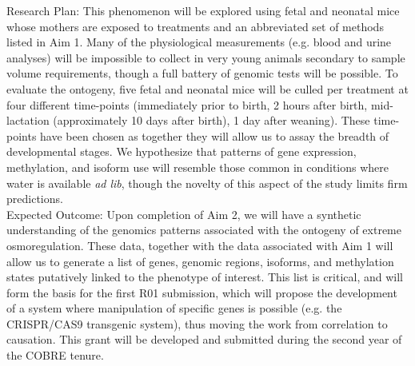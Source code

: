 \documentclass[12pt]{article}
\begin{document}
Research Plan: This phenomenon will be explored using fetal and neonatal mice whose mothers are exposed to treatments and an abbreviated set of methods listed in Aim 1. Many of the physiological measurements  (e.g. blood and urine analyses) will be impossible to collect in very young animals secondary to sample volume requirements, though a full battery of genomic tests will be possible. To evaluate the ontogeny, five fetal and neonatal mice will be culled per treatment at four different time-points (immediately prior to birth, 2 hours after birth, mid-lactation (approximately 10 days after birth), 1 day after weaning). These time-points have been chosen as together they will allow us to assay the breadth of developmental stages.  We hypothesize that patterns of gene expression, methylation, and isoform use will resemble those common in conditions where water is available \textit{ad lib}, though the novelty of this aspect of the study limits firm predictions. \\

Expected Outcome: Upon completion of Aim 2, we will have a synthetic understanding of the genomics patterns associated with the ontogeny of extreme osmoregulation. These data, together with the data associated with Aim 1 will allow us to generate a list of genes, genomic regions, isoforms, and methylation states putatively linked to the phenotype of interest. This list is critical, and will form the basis for the first R01 submission, which will propose the development of a system where manipulation of specific genes is possible (e.g. the CRISPR/CAS9 transgenic system), thus moving the work from correlation to causation. This grant will be developed and submitted during the second year of the COBRE tenure.
\end{document}
